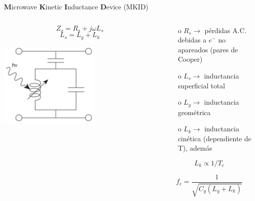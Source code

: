 \documentclass[ignorenonframetext,12pt]{beamer}
\begin{document}
\begin{frame}{\textbf{M}icrowave \textbf{K}inetic \textbf{I}nductance
				\textbf{D}evice (MKID)}
				\begin{columns}
								\begin{column}{0.49\textwidth}
												\begin{equation*}
																Z_s = R_s + j \omega L_s
												\end{equation*}
												\begin{equation*}
																L_s = L_g + L_k
												\end{equation*}

												\flushleft	\includegraphics[width=0.6\textwidth]{LCR_mkid}
								\end{column}
								\begin{column}{0.59\textwidth}
												\begin{itemize}
																\item[o] $R_s \to$ pérdidas A.C. debidas a $e^-$ no apareados
																				(pares de Cooper)
																\item[o] $L_s \to$ inductancia superficial total
																\item[o] $L_g \to$ inductancia geométrica
																\item[o] $L_k \to$ inductancia cinética
																				({\color{blue}dependiente de T}), además
												\end{itemize}

												\begin{equation*}
																L_k \propto 1/T_c
												\end{equation*}

												\begin{equation*}
																f_r = \frac{1}{\sqrt{C_g(L_g + L_k)}}
												\end{equation*}
								\end{column}
				\end{columns}
\end{frame}
\end{document}
